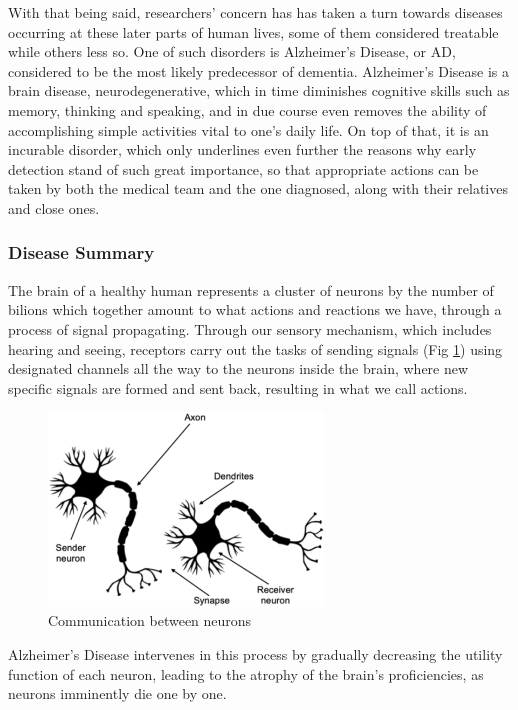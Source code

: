 \documentclass[a4paper, 12pt]{article}
\begin{document}
With that being said, researchers' concern has has taken a turn towards diseases occurring at these later
parts of human lives, some of them considered treatable while others less so.
One of such disorders is Alzheimer's Disease, or AD, considered to be the most likely predecessor of dementia.
Alzheimer's Disease is a brain disease, neurodegenerative, which in time diminishes cognitive skills such as memory,
thinking and speaking, and in due course even removes the ability of accomplishing simple activities vital to one's
daily life.
On top of that, it is an incurable disorder, which only underlines even further the reasons why early
detection stand of such great importance, so that appropriate actions can be taken by both the medical team
and the one diagnosed, along with their relatives and close ones.

\subsubsection{Disease Summary}

The brain of a healthy human represents a cluster of neurons by the number of bilions which together amount to
what actions and reactions we have, through a process of signal propagating.
Through our sensory mechanism, which includes hearing and seeing, receptors carry out the tasks of sending signals
(Fig \ref{fig:neuron-communication}) using designated channels all the way to the neurons inside the brain, where new
specific signals are formed and sent back, resulting in what we call actions. \cite{Sivadas2020HowDM}

\begin{figure}[htbp]
    \centering
    \includegraphics[width=0.65\textwidth]{figs/neuron-communication.jpg}
    \caption{Communication between neurons}
    \label{fig:neuron-communication}
\end{figure}

Alzheimer's Disease intervenes in this process by gradually decreasing the utility function of each neuron, leading to
the atrophy of the brain's proficiencies, as neurons imminently die one by one.
\end{document}
